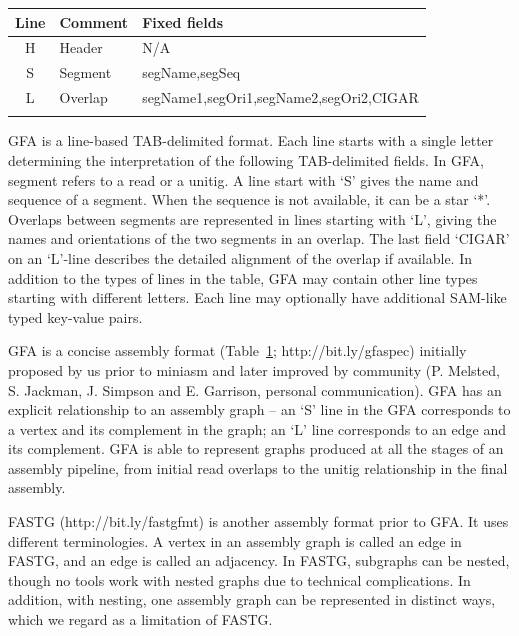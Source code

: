 \documentclass{bioinfo}
\begin{document}
\begin{methods}
\begin{table}[tb]
{\footnotesize\label{tab:gfa}
\begin{tabular}{clp{5.8cm}}
\toprule
Line & Comment & Fixed fields \\
\midrule
H    & Header  & N/A \\
S    & Segment & segName,segSeq \\
L    & Overlap & segName1,segOri1,segName2,segOri2,CIGAR \\
\botrule
\end{tabular}
}{GFA is a line-based TAB-delimited format. Each line starts with a single
letter determining the interpretation of the following TAB-delimited fields. In
GFA, segment refers to a read or a unitig. A line start with `S' gives the name
and sequence of a segment. When the sequence is not available, it can be a star
`*'. Overlaps between segments are represented in lines starting with `L',
giving the names and orientations of the two segments in an overlap. The last
field `CIGAR' on an `L'-line describes the detailed alignment of the overlap if
available. In addition to the types of lines in the table, GFA may contain
other line types starting with different letters. Each line may optionally have
additional SAM-like typed key-value pairs.}
\end{table}

GFA is a concise assembly format (Table~\ref{tab:gfa}; http://bit.ly/gfaspec) initially proposed by
us prior to miniasm and later improved by community (P. Melsted, S.  Jackman,
J. Simpson and E. Garrison, personal communication). GFA has an explicit
relationship to an assembly graph -- an `S' line in the GFA corresponds to a
vertex and its complement in the graph; an `L' line corresponds to an edge and
its complement. GFA is able to represent graphs produced at all the stages of
an assembly pipeline, from initial read overlaps to the unitig relationship in
the final assembly.

FASTG (http://bit.ly/fastgfmt) is another assembly format prior to GFA.
It uses different terminologies. A vertex in an assembly graph is called an
edge in FASTG, and an edge is called an adjacency. In FASTG, subgraphs can be
nested, though no tools work with nested graphs due to technical complications.
In addition, with nesting, one assembly graph can be represented in distinct
ways, which we regard as a limitation of FASTG.

\end{methods}
\end{document}
